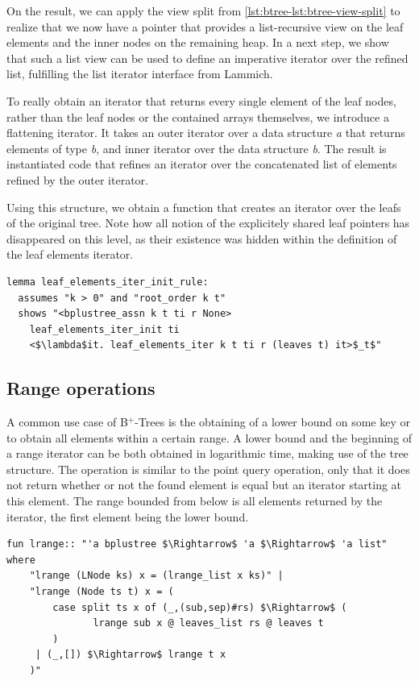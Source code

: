 \documentclass[a4paper,UKenglish,cleveref, autoref, thm-restate]{lipics-v2021}
\newcommand{\btrees}{B$^+$-Trees}
\begin{document}
On the result, we can apply the view split from \autoref{lst:btree-lst:btree-view-split}
to realize that we now have a pointer that provides a list-recursive
view on the leaf elements and the inner nodes on the remaining heap.
In a next step, we show that such a list view can be used
to define an imperative iterator over the refined list,
fulfilling the list iterator interface from Lammich. \cite{DBLP:conf/itp/Lammich19}

To really obtain an iterator that returns every single element of the
leaf nodes, rather than the leaf nodes or the contained arrays themselves,
we introduce a flattening iterator.
It takes an outer iterator over a data structure \textit{a} that returns elements of type \textit{b},
and inner iterator over the data structure \textit{b}.
The result is instantiated code that refines an iterator
over the concatenated list of elements refined by the outer iterator.

Using this structure, we obtain a function that creates an iterator
over the leafs of the original tree.
Note how all notion of the explicitely shared leaf pointers
has disappeared on this level, as their existence was hidden within the definition
of the leaf elements iterator.

\begin{lstlisting}[mathescape=true, language=Isabelle,label=lst:btree-view-split]
lemma leaf_elements_iter_init_rule:
  assumes "k > 0" and "root_order k t"
  shows "<bplustree_assn k t ti r None>
    leaf_elements_iter_init ti
    <$\lambda$it. leaf_elements_iter k t ti r (leaves t) it>$_t$"
\end{lstlisting}

\subsection{Range operations}
\label{sec:imperative_range}

A common use case of \btrees
is the obtaining of a lower bound on some key
or to obtain  all elements within a certain range. \cite{DBLP:journals/ftdb/Graefe11}
A lower bound and the beginning of a range iterator
can be both obtained in logarithmic time, making use of the tree structure.
The operation is similar to the point query operation,
only that it does not return whether or not the
found element is equal but an iterator starting at this element.
The range bounded from below is all elements returned by the iterator,
the first element being the lower bound.

\begin{lstlisting}[mathescape=true, language=Isabelle,label=lst:btree-lrange]
fun lrange:: "'a bplustree $\Rightarrow$ 'a $\Rightarrow$ 'a list" where
    "lrange (LNode ks) x = (lrange_list x ks)" |
    "lrange (Node ts t) x = (
        case split ts x of (_,(sub,sep)#rs) $\Rightarrow$ (
               lrange sub x @ leaves_list rs @ leaves t
        )
     | (_,[]) $\Rightarrow$ lrange t x
    )"
\end{lstlisting}
  
\end{document}
